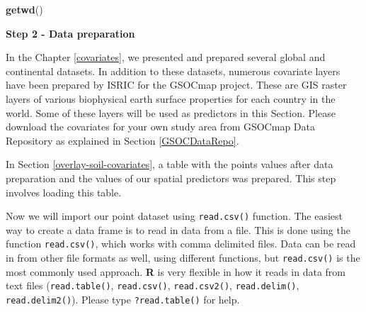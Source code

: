 \documentclass[10pt,b5paper,]{book}
\newenvironment{Shaded}{\begin{snugshade}}{\end{snugshade}}
\newcommand{\CommentTok}[1]{\textcolor[rgb]{0.56,0.35,0.01}{\textit{#1}}}
\newcommand{\KeywordTok}[1]{\textcolor[rgb]{0.13,0.29,0.53}{\textbf{#1}}}
\newcommand{\NormalTok}[1]{#1}
\newcommand{\OperatorTok}[1]{\textcolor[rgb]{0.81,0.36,0.00}{\textbf{#1}}}
\newcommand{\StringTok}[1]{\textcolor[rgb]{0.31,0.60,0.02}{#1}}
\theoremstyle{definition}
\theoremstyle{definition}
\theoremstyle{definition}
\theoremstyle{remark}
\begin{document}
\begin{Shaded}
\begin{Highlighting}[]
\KeywordTok{getwd}\NormalTok{()}
\end{Highlighting}
\end{Shaded}

\textbf{Step 2 - Data preparation}

In the Chapter \ref{covariates}, we presented and prepared several
global and continental datasets. In addition to these datasets, numerous
covariate layers have been prepared by ISRIC for the GSOCmap project.
These are GIS raster layers of various biophysical earth surface
properties for each country in the world. Some of these layers will be
used as predictors in this Section. Please download the covariates for
your own study area from GSOCmap Data Repository as explained in Section
\ref{GSOCDataRepo}.

In Section \ref{overlay-soil-covariates}, a table with the points values
after data preparation and the values of our spatial predictors was
prepared. This step involves loading this table.

Now we will import our point dataset using \texttt{read.csv()} function.
The easiest way to create a data frame is to read in data from a file.
This is done using the function \texttt{read.csv()}, which works with
comma delimited files. Data can be read in from other file formats as
well, using different functions, but \texttt{read.csv()} is the most
commonly used approach. \textbf{R} is very flexible in how it reads in
data from text files (\texttt{read.table()}, \texttt{read.csv()},
\texttt{read.csv2()}, \texttt{read.delim()}, \texttt{read.delim2()}).
Please type \texttt{?read.table()} for help.

\begin{Shaded}
\end{Shaded}
\end{document}
